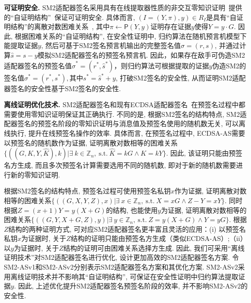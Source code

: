 \documentclass[review]{jcr}
\begin{document}
\begin{trivlist}
\item \textbf{可证明安全.} SM2适配器签名采用具有在线提取器性质的非交互零知识证明~\cite{Fischlin05}提供的``自证明结构''~\cite{AumayrEEFHMMR20}保证可证明安全. 具体而言, $(I=(Y,\pi),y)\in R_I$是具有``自证明结构''的离散对数困难关系~\cite{AumayrEEFHMMR20}, 其中$\pi\leftarrow \mathsf{P}(Y,y)$证明存在证据$y$使得$Y=y\cdot G$. 因此, 根据困难关系的``自证明结构'', 在安全性证明中, 归约算法在随机预言机模型下能提取证据$y$, 然后可基于SM2签名预言机输出的完整签名值$\sigma=(r,s)$, 并通过计算$\hat{s}=s-y$模拟SM2适配器签名的预签名预言机. 因此，如果存在敌手可伪造SM2适配器签名的预签名值$\hat{\sigma}^*=(r^*,\hat{s}^*)$，则归约算法可根据提取的证据$y$伪造SM2的签名值$\sigma^*=(r^*,s^*), 其中 s^*=\hat{s}^*+y$, 打破SM2签名的安全性, 从而证明SM2适配器签名的安全性基于SM2签名的安全性.
\end{trivlist}

\begin{trivlist}
\item \textbf{离线证明优化技术.} SM2适配器签名和现有ECDSA适配器签名~\cite{AumayrEEFHMMR20}在预签名过程中都需要使用零知识证明保证其正确执行. 不同的是, 根据SM2签名的结构特点, SM2适配器签名的预签名阶段的零知识证明与消息值及预签名使用的随机数无关, 可以离线执行, 提升在线预签名操作的效率. 具体而言, 在预签名过程中, ECDSA-AS需要以预签名的随机数作为证据, 证明离散对数相等的困难关系$\{((G,K,Y,\hat{K}),k)|\exists\ k\in \mathbb{Z}_n,\ \text{s.t.}\ \hat{K}=kG\wedge K=kY\}$. 因此, 该证明只能由预签名方生成, 而且多次预签名计算需要选用不同的随机数, 即对于新的随机数需要进行新的零知识证明. 

根据SM2签名的结构特点, 预签名过程可使用预签名私钥$x$作为证据, 证明离散对数相等的困难关系$\{((G,X,Y,Z),x)|\exists\ x\in \mathbb{Z}_n,\ \text{s.t.}\ X=xG\wedge Z-Y=xY\}$. 同时根据$Z=(x+1)Y=y(X+G)$的结构, 也能使用$y$为证据, 证明离散对数相等的困难关系$\{((G,Y,X+G,Z),y)|\exists\ y\in \mathbb{Z}_n,\ \text{s.t.}\ Z=y(X+G)\wedge Y=yG\}$. 根据$Z$结构的两种证明方式, 可对应SM2适配器签名更丰富且灵活的应用：(i) 以预签名私钥$x$为证据时, 关于$Z$结构的证明只能由预签名方生成（类似ECDSA-AS）;（ii）以$y$为证据时, 关于$Z$结构的证明可由困难关系选择方生成.
因此, 我们可采用``离线证明技术''对SM2适配器签名进行优化, 设计更加高效的SM2适配器签名方案. 令SM2-ASv1和SM2-ASv2分别表示SM2适配器签名方案和其优化方案. SM2-ASv2采用离线证明技术并不影响其``自证明结构'', 可保证在安全性证明中归约算法提取证据$y$. 因此, 上述优化提升SM2适配器签名预签名阶段的效率, 并不影响SM2-ASv2的安全性.
\end{trivlist}
\end{document}
